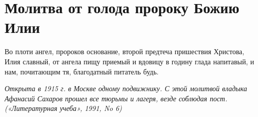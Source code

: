 \section{Молитва от голода пророку Божию Илии}\begin{mymulticols}
 

Во плоти ангел, пророков основание, второй предтеча пришествия Христова, Илия славный, от ангела пищу приемый и вдовицу в годину глада напитавый, и нам, почитающим тя, благодатный питатель будь.

\par
\itshape Открыта в 1915 г. в Москве одному подвижнику. С этой молитвой владыка Афанасий Сахаров прошел все тюрьмы и лагеря, везде соблюдая пост. («Литературная учеба», 1991, No 6)\normalfont{}

\end{mymulticols}

\mychapterending


 
